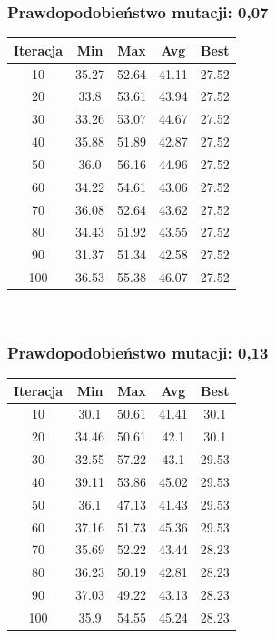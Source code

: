 \documentclass[a4paper,11pt]{article}
\begin{document}
			\subsubsection{Prawdopodobieństwo mutacji: 0,07}
				\begin{tabular}{|c|c|c|c|c|}
					\hline 
					Iteracja &  Min &  Max & Avg & Best\\
					\hline
					10 & 35.27 & 52.64 & 41.11 & 27.52\\
					\hline
					20 & 33.8 & 53.61 & 43.94 & 27.52\\
					\hline
					30 & 33.26 & 53.07 & 44.67 & 27.52\\
					\hline
					40 & 35.88 & 51.89 & 42.87 & 27.52\\
					\hline
					50 & 36.0 & 56.16 & 44.96 & 27.52\\
					\hline
					60 & 34.22 & 54.61 & 43.06 & 27.52\\
					\hline
					70 & 36.08 & 52.64 & 43.62 & 27.52\\
					\hline
					80 & 34.43 & 51.92 & 43.55 & 27.52\\
					\hline
					90 & 31.37 & 51.34 & 42.58 & 27.52\\
					\hline
					100 & 36.53 & 55.38 & 46.07 & 27.52\\
					\hline
				\end{tabular} \\
			\subsubsection{Prawdopodobieństwo mutacji: 0,13}
			\begin{tabular}{|c|c|c|c|c|}
				\hline 
				Iteracja &  Min &  Max & Avg & Best\\
				\hline
				10 & 30.1 & 50.61 & 41.41 & 30.1\\
				\hline
				20 & 34.46 & 50.61 & 42.1 & 30.1\\
				\hline
				30 & 32.55 & 57.22 & 43.1 & 29.53\\
				\hline
				40 & 39.11 & 53.86 & 45.02 & 29.53\\
				\hline
				50 & 36.1 & 47.13 & 41.43 & 29.53\\
				\hline
				60 & 37.16 & 51.73 & 45.36 & 29.53\\
				\hline
				70 & 35.69 & 52.22 & 43.44 & 28.23\\
				\hline
				80 & 36.23 & 50.19 & 42.81 & 28.23\\
				\hline
				90 & 37.03 & 49.22 & 43.13 & 28.23\\
				\hline
				100 & 35.9 & 54.55 & 45.24 & 28.23\\
				\hline
			\end{tabular} \\
\end{document}
